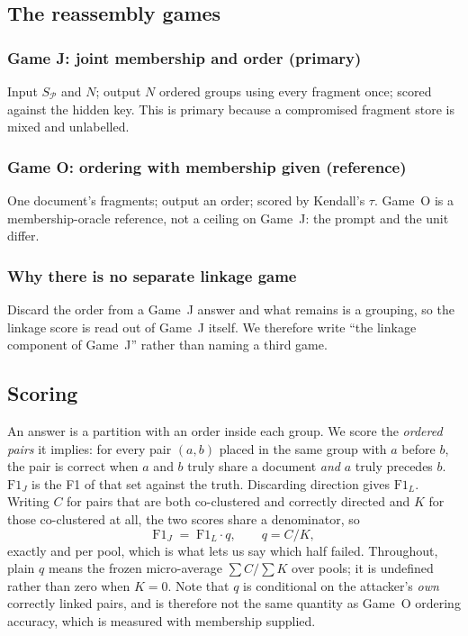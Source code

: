 \documentclass[sigconf,review]{acmart}
\newcommand{\FJ}{\ensuremath{\mathrm{F1}_{J}}}
\newcommand{\FL}{\ensuremath{\mathrm{F1}_{L}}}
\begin{document}
\subsection{The reassembly games}
\label{sec:games}

\subsubsection{Game J: joint membership and order (primary)}
Input $S_{\mathcal{P}}$ and $N$; output $N$ ordered groups using every fragment
once; scored against the hidden key. This is primary because a compromised
fragment store is mixed and unlabelled.

\subsubsection{Game O: ordering with membership given (reference)}
One document's fragments; output an order; scored by Kendall's $\tau$. Game~O
is a membership-oracle reference, not a ceiling on Game~J: the prompt and the
unit differ.

\subsubsection{Why there is no separate linkage game}
Discard the order from a Game~J answer and what remains is a grouping, so the
linkage score is read out of Game~J itself. We therefore write ``the linkage
component of Game~J'' rather than naming a third game.

\subsection{Scoring}
\label{sec:scoring}
An answer is a partition with an order inside each group. We score the
\emph{ordered pairs} it implies: for every pair $(a,b)$ placed in the same group
with $a$ before $b$, the pair is correct when $a$ and $b$ truly share a document
\emph{and} $a$ truly precedes $b$. \FJ{} is the F1 of that set against the
truth. Discarding direction gives \FL. Writing $C$ for pairs that are both
co-clustered and correctly directed and $K$ for those co-clustered at all, the
two scores share a denominator, so
\[
  \FJ \;=\; \FL \cdot q, \qquad q = C/K,
\]
exactly and per pool, which is what lets us say which half failed. Throughout,
plain $q$ means the frozen micro-average $\sum C / \sum K$ over pools; it is
undefined rather than zero when $K=0$. Note that $q$ is conditional on the
attacker's \emph{own} correctly linked pairs, and is therefore not the same
quantity as Game~O ordering accuracy, which is measured with membership
supplied.
\end{document}

